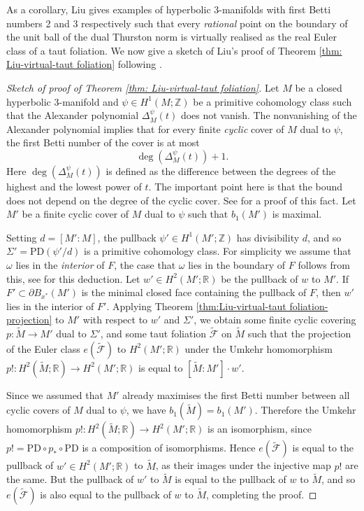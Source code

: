 \documentclass[11pt]{amsart}
\theoremstyle{remark}
\theoremstyle{definition}
\begin{document}
	As a corollary, Liu gives examples of hyperbolic 3-manifolds with first Betti numbers 2 and 3 respectively such that every \emph{rational} point on the boundary of the unit ball of the dual Thurston norm is virtually realised as the real Euler class of a taut foliation. We now give a sketch of Liu's proof of Theorem \ref{thm: Liu-virtual-taut foliation} following \cite{liu2024criterion}.
	
	\begin{proof}[Sketch of proof of Theorem \ref{thm: Liu-virtual-taut foliation}] Let $M$ be a closed hyperbolic 3-manifold and $\psi \in H^1(M ; \mathbb{Z})$ be a primitive cohomology class such that the Alexander polynomial $\Delta_M^\psi(t)$ does not vanish. The nonvanishing of the Alexander polynomial implies that for every finite \emph{cyclic} cover of $M$ dual to $\psi$, the first Betti number of the cover is at most 
	\[ \deg(\Delta_M^\psi(t))+1. \]
	Here $\deg(\Delta_M^\psi(t))$ is defined as the difference between the degrees of the highest and the lowest power of $t$. The important point here is that the bound does not depend on the degree of the cyclic cover. See \cite[Lemma 3.3]{liu2024criterion} for a proof of this fact. Let $M'$ be a finite cyclic cover of $M$ dual to $\psi$ such that $b_1(M')$ is maximal. 
	
	Setting $d = [M' : M]$, the pullback $\psi' \in H^1(M' ; \mathbb{Z})$ has divisibility $d$, and so $\Sigma' = \mathrm{PD}(\psi'/d)$ is a primitive cohomology class. For simplicity we assume that $\omega$ lies in the \emph{interior} of $F$, the case that $\omega$ lies in the boundary of $F$ follows from this, see \cite[page 2]{liu2024criterion} for this deduction. Let $w' \in H^2(M' ;\mathbb{R})$ be the pullback of $w$ to $M'$. If $F' \subset \partial B_{x^*}(M')$ is the minimal closed face containing the pullback of $F$, then $w'$ lies in the interior of $F'$. Applying Theorem \ref{thm:Liu-virtual-taut foliation-projection} to $M'$ with respect to $w'$ and $\Sigma'$, we obtain some finite cyclic covering $p \colon \tilde{M} \rightarrow M'$ dual to $\Sigma'$, and some taut foliation $\tilde{\mathcal{F}}$ on $\tilde{M}$ such that the projection of the Euler class $e(\tilde{\mathcal{F}})$ to $H^2(M' ; \mathbb{R})$ under the Umkehr homomorphism $p! \colon H^2(\tilde{M}; \mathbb{R}) \rightarrow H^2(M' ; \mathbb{R})$ is equal to $[\tilde{M} : M'] \cdot w'$. 
	
	Since we assumed that $M'$ already maximises the first Betti number between all cyclic covers of $M$ dual to $\psi$, we have $b_1(\tilde{M}) = b_1(M')$. Therefore the Umkehr homomorphism $p! \colon H^2(\tilde{M} ; \mathbb{R}) \rightarrow H^2(M' ; \mathbb{R})$ is an isomorphism, since $p! = \mathrm{PD} \circ p_* \circ \mathrm{PD}$ is a composition of isomorphisms. Hence $e(\tilde{\mathcal{F}})$ is equal to the pullback of $w' \in H^2(M' ; \mathbb{R})$ to $\tilde{M}$, as their images under the injective map $p!$ are the same. But the pullback of $w'$ to $\tilde{M}$ is equal to the pullback of $w$ to $\tilde{M}$, and so $e(\tilde{\mathcal{F}})$ is also equal to the pullback of $w$ to $\tilde{M}$, completing the proof. 
	

\end{proof}
\end{document}
